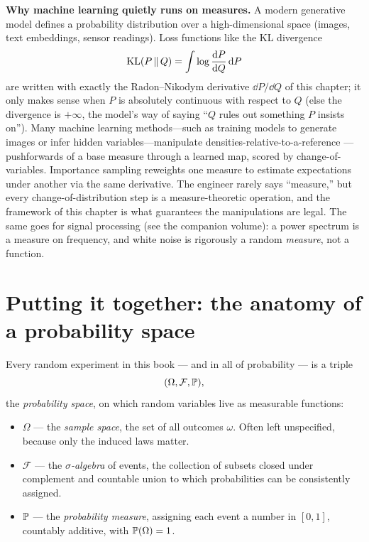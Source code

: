 \begin{applicationbox}
\textbf{Why machine learning quietly runs on measures.} A modern generative model
defines a probability distribution over a high-dimensional space (images, text
embeddings, sensor readings). Loss functions like the KL divergence
\[
  \KL(P \,\|\, Q) = \int \log\frac{\dd P}{\dd Q}\,\dd P
\]
are written with exactly the
Radon--Nikodym derivative $\dd P/\dd Q$ of this chapter; it only makes sense when
$P$ is absolutely continuous with respect to $Q$ (else the divergence is
$+\infty$, the model's way of saying ``$Q$ rules out something $P$ insists on'').
Many machine learning methods---such as training models to generate images or infer hidden variables---manipulate densities-relative-to-a-reference --- pushforwards of a base measure through a
learned map, scored by change-of-variables. Importance sampling reweights one
measure to estimate expectations under another via the same derivative. The
engineer rarely says ``measure,'' but every change-of-distribution step is a
measure-theoretic operation, and the framework of this chapter is what guarantees
the manipulations are legal. The same goes for signal processing (see the
companion volume): a power spectrum is a measure on frequency, and white noise is
rigorously a random \emph{measure}, not a function.
\end{applicationbox}

\section{Putting it together: the anatomy of a probability space}
\label{ch36:anatomy}

Every random experiment in this book --- and in all of probability --- is a
triple
\[
  (\Omega, \mathcal{F}, \P),
\]
the \emph{probability space}, on which random variables live as measurable
functions:

\begin{itemize}
  \item $\Omega$ --- the \emph{sample space}, the set of all outcomes $\omega$.
        Often left unspecified, because only the induced laws matter.
  \item $\mathcal{F}$ --- the \emph{$\sigma$-algebra} of events, the collection of
        subsets closed under complement and countable union to which probabilities
        can be consistently assigned.
  \item $\P$ --- the \emph{probability measure}, assigning each event a number in
        $[0,1]$, countably additive, with $\P(\Omega) = 1$.
\end{itemize}

